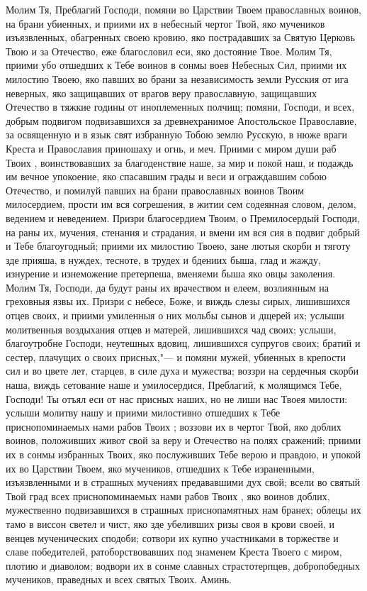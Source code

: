 \begin{mymulticols}
Молим Тя, Преблагий Господи, помяни во Царствии Твоем православных воинов, на брани убиенных, и приими их в небесный чертог Твой, яко мучеников изъязвленных, обагренных своею кровию, яко пострадавших за Святую Церковь Твою и за Отечество, еже благословил еси, яко достояние Твое. Молим Тя, приими убо отшедших к Тебе воинов в сонмы воев Небесных Сил, приими их милостию Твоею, яко павших во брани за независимость земли Русския от ига неверных, яко защищавших от врагов веру православную, защищавших Отечество в тяжкие годины от иноплеменных полчищ; помяни, Господи, и всех, добрым подвигом подвизавшихся за древнехранимое Апостольское Православие, за освященную и в язык свят избранную Тобою землю Русскую, в нюже враги Креста и Православия приношаху и огнь, и меч. Приими с миром души раб Твоих , воинствовавших за благоденствие наше, за мир и покой наш, и подаждь им вечное упокоение, яко спасавшим грады и веси и ограждавшим собою Отечество, и помилуй павших на брани православных воинов Твоим милосердием, прости им вся согрешения, в житии сем содеянная словом, делом, ведением и неведением. Призри благосердием Твоим, о Премилосердый Господи, на раны их, мучения, стенания и страдания, и вмени им вся сия в подвиг добрый и Тебе благоугодный; приими их милостию Твоею, зане лютыя скорби и тяготу зде прияша, в нуждех, тесноте, в трудех и бдениих быша, глад и жажду, изнурение и изнеможение претерпеша, вменяеми быша яко овцы заколения. Молим Тя, Господи, да будут раны их врачеством и елеем, возлиянным на греховныя язвы их. Призри с небесе, Боже, и виждь слезы сирых, лишившихся отцев своих, и приими умиленныя о них мольбы сынов и дщерей их; услыши молитвенныя воздыхания отцев и матерей, лишившихся чад своих; услыши, благоутробне Господи, неутешных вдовиц, лишившихся супругов своих; братий и сестер, плачущих о своих присных,"--- и помяни мужей, убиенных в крепости сил и во цвете лет, старцев, в силе духа и мужества; воззри на сердечныя скорби наша, виждь сетование наше и умилосердися, Преблагий, к молящимся Тебе, Господи! Ты отъял еси от нас присных наших, но не лиши нас Твоея милости: услыши молитву нашу и приими милостивно отшедших к Тебе приснопоминаемых нами рабов Твоих ; воззови их в чертог Твой, яко доблих воинов, положивших живот свой за веру и Отечество на полях сражений; приими их в сонмы избранных Твоих, яко послуживших Тебе верою и правдою, и упокой их во Царствии Твоем, яко мучеников, отшедших к Тебе израненными, изъязвленными и в страшных мучениях предававшими дух свой; всели во святый Твой град всех приснопоминаемых нами рабов Твоих , яко воинов доблих, мужественно подвизавшихся в страшных приснопамятных нам бранех; облецы их тамо в виссон светел и чист, яко зде убеливших ризы своя в крови своей, и венцев мученических сподоби; сотвори их купно участниками в торжестве и славе победителей, ратоборствовавших под знаменем Креста Твоего с миром, плотию и диаволом; водвори их в сонме славных страстотерпцев, добропобедных мучеников, праведных и всех святых Твоих. Аминь. 

\end{mymulticols}

